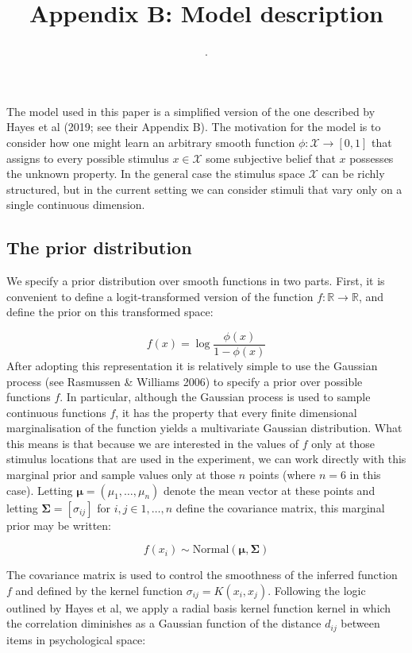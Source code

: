 \documentclass[
  english,
  doc]{apa6}
\author{.}
\affiliation{\phantom{a}}
\title{Appendix B: Model description}
\date{}
\begin{document}
\maketitle

\noindent
The model used in this paper is a simplified version of the one described by Hayes et al (2019; see their Appendix B). The motivation for the model is to consider how one might learn an arbitrary smooth function \(\phi : \mathcal{X} \rightarrow [0, 1]\) that assigns to every possible stimulus \(x \in \mathcal{X}\) some subjective belief that \(x\) possesses the unknown property. In the general case the stimulus space \(\mathcal{X}\) can be richly structured, but in the current setting we can consider stimuli that vary only on a single continuous dimension.

\hypertarget{the-prior-distribution}{%
\subsection{The prior distribution}\label{the-prior-distribution}}

\noindent
We specify a prior distribution over smooth functions in two parts. First, it is convenient to define a logit-transformed version of the function \(f : \mathbb{R} \rightarrow \mathbb{R}\), and define the prior on this transformed space:

\[
f(x) = \log \frac{\phi(x)}{1 - \phi(x)}
\]
After adopting this representation it is relatively simple to use the Gaussian process (see Rasmussen \& Williams 2006) to specify a prior over possible functions \(f\). In particular, although the Gaussian process is used to sample continuous functions \(f\), it has the property that every finite dimensional marginalisation of the function yields a multivariate Gaussian distribution. What this means is that because we are interested in the values of \(f\) only at those stimulus locations that are used in the experiment, we can work directly with this marginal prior and sample values only at those \(n\) points (where \(n = 6\) in this case). Letting \(\bm{\mu} = (\mu_1, \ldots, \mu_n)\) denote the mean vector at these points and letting \(\bm{\Sigma} = [\sigma_{ij}]\) for \(i, j \in 1, \ldots, n\) define the covariance matrix, this marginal prior may be written:

\[
f(x_i) \sim \mbox{Normal}(\bm\mu, \bm\Sigma)
\]

\noindent
The covariance matrix is used to control the smoothness of the inferred function \(f\) and defined by the kernel function \(\sigma_{ij} = K(x_i, x_j)\). Following the logic outlined by Hayes et al, we apply a radial basis kernel function kernel in which the correlation diminishes as a Gaussian function of the distance \(d_{ij}\) between items in psychological space:
\end{document}
